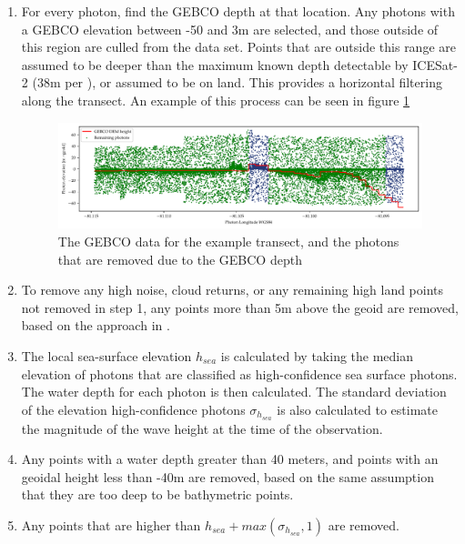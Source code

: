 \begin{enumerate}
    \item For every photon, find the GEBCO depth at that location. Any photons with a GEBCO elevation between -50 and 3m are selected, and those outside of this region are culled from the data set. Points that are outside this range are assumed to be deeper than the maximum known depth detectable by ICESat-2 (38m per \citeauthor{Parrish2019}), or assumed to be on land. This provides a horizontal filtering along the transect. An example of this process can be seen in figure \ref{fig:gebco_filtering}
    
    \begin{figure}[h]
        \centering
        \includegraphics[width=\textwidth]{figures/methodology_gebco_filtering.pdf}
        \caption{The GEBCO data for the example transect, and the photons that are removed due to the GEBCO depth}
        \label{fig:gebco_filtering}
    \end{figure}

    \item To remove any high noise, cloud returns, or any remaining high land points not removed in step 1, any points more than 5m above the geoid are removed, based on the approach in \citeauthor{Ranndal2021}.
    \item The local sea-surface elevation $h_{sea}$ is calculated by taking the median elevation of photons that are classified as high-confidence sea surface photons. The water depth for each photon is then calculated. The standard deviation of the elevation high-confidence photons $\sigma_{h_{sea}}$ is also calculated to estimate the magnitude of the wave height at the time of the observation.
    \item Any points with a water depth greater than 40 meters, and points with an geoidal height  less than -40m are removed, based on the same assumption that they are too deep to be bathymetric points. 
    \item Any points that are higher than $h_{sea} + max(\sigma_{h_{sea}},1)$ are removed. 
    

\end{enumerate}

